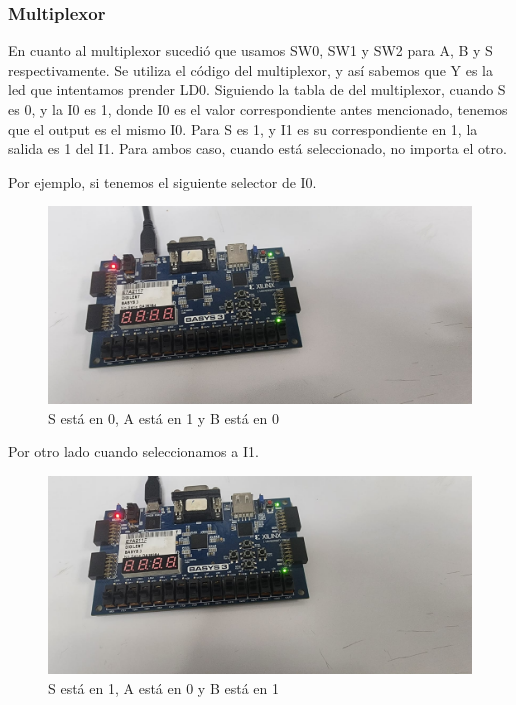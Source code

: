 \documentclass[12pt]{article}  %
\begin{document}
\subsubsection*{Multiplexor}
En cuanto al multiplexor sucedió que usamos SW0, SW1 y SW2 para A, B y S respectivamente. Se utiliza el código del multiplexor, y así sabemos que Y es la led que intentamos prender LD0. Siguiendo la tabla de del multiplexor, cuando S es 0, y la I0 es 1, donde I0 es el valor correspondiente antes mencionado, tenemos que el output es el mismo I0. Para S es 1, y I1 es su correspondiente en 1, la salida es 1 del I1. Para ambos caso, cuando está seleccionado, no importa el otro.

Por ejemplo, si tenemos el siguiente selector de I0.

\begin{figure}[!ht]
    \centering
    \caption{S está en 0, A está en 1 y B está en 0}
    \includegraphics[width=1\linewidth]{simulations/multiplex/multiplex2.jpg}
\end{figure}

Por otro lado cuando seleccionamos a I1.

\begin{figure}[!ht]
    \centering
    \caption{S está en 1, A está en 0 y B está en 1}
    \includegraphics[width=1\linewidth]{simulations/multiplex/multiplex5.jpg}
\end{figure}
\end{document}
